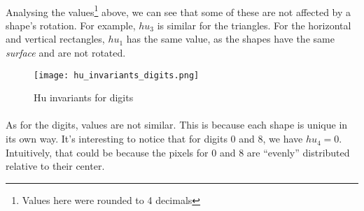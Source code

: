 \paragraph{}
Analysing the values\footnote{Values here were rounded to 4 decimals} above, we can see that some of these are not affected by a shape's rotation.
For example, $hu_3$ is similar for the triangles. For the horizontal and vertical rectangles, $hu_1$ has the same value, as the shapes have the same \emph{surface} and are not rotated.

\begin{figure}[h]
    \centering
    \texttt{[image: hu\_invariants\_digits.png]}
    \caption{Hu invariants for digits}
\end{figure}

\paragraph{}
As for the digits, values are not similar. This is because each shape is unique in its own way.
It's interesting to notice that for digits $0$ and $8$, we have $hu_4 = 0$. Intuitively, that could be because the pixels for $0$ and $8$ are ``evenly'' distributed relative to their center.